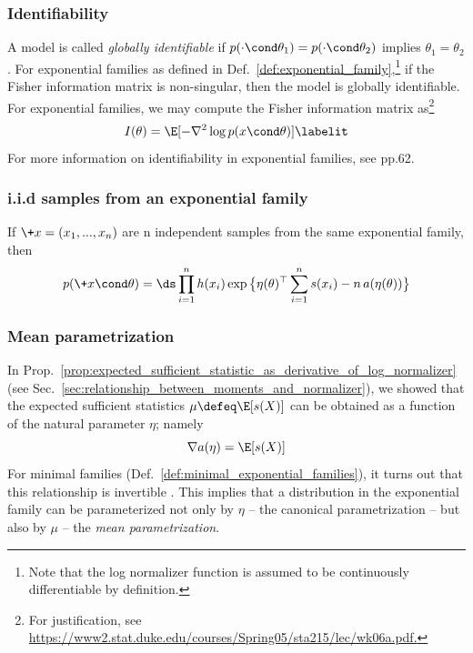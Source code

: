\documentclass{article} %
\newcommand{\logNormalizerFunction}{a}
\newcommand{\sufficientStatsFunction}{s}
\newcommand{\carrierDensity}{h}
\newcommand{\meanParameter}{\mu}
\newcommand{\param}{\theta}
\newcommand{\naturalParam}{\eta}
\begin{document}
\subsubsection{Identifiability}

A model is called \textit{globally identifiable} if $p(\cdot \cond \param_1) = p(\cdot \cond \param_2)$ implies $\param_1=\param_2$ \cite{cole2020parameter}. For exponential families as defined in Def.~\ref{def:exponential_family},\footnote{Note that the log normalizer function is assumed to be continuously differentiable by definition.} if the Fisher information matrix is non-singular, then the model is globally identifiable.  For exponential families, we may compute the Fisher information matrix as\footnote{For justification, see \url{https://www2.stat.duke.edu/courses/Spring05/sta215/lec/wk06a.pdf.}}
\begin{align*}
I(\param) = \E [ -\nabla^2 \log p(x \cond \param)]
\labelit \label{eqn:fisher_information_matrix_for_exponential_families}	
\end{align*}
For more information on identifiability in exponential families, see \cite{cole2020parameter} pp.62. 

\subsubsection{i.i.d samples from an exponential family} \label{sec:iid_samples_from_an_exponential_family}
If $\+x=(x_1, ..., x_n)$ are n independent samples from the same exponential family, then 
\begin{align}
\label{eqn:exponential_family_iid}
 p(\+x \cond \param) = \ds\prod_{i=1}^n \carrierDensity(x_i) \exp \big\{ \naturalParam(\param)^\top \sum_{i=1}^n \sufficientStatsFunction(x_i) - n \,\logNormalizerFunction(\naturalParam(\param))\big\} 
 \end{align}


\subsubsection{Mean parametrization} \label{sec:mean_parametrization}

In Prop.~\ref{prop:expected_sufficient_statistic_as_derivative_of_log_normalizer} (see Sec.~\ref{sec:relationship_between_moments_and_normalizer}), we showed that the expected sufficient statistics $\meanParameter \defeq \E[\sufficientStatsFunction(X)]$ can be obtained as a function of the natural parameter $\naturalParam$; namely
%
\[ \nabla \logNormalizerFunction(\naturalParam) = \E[\sufficientStatsFunction(X)] \]
%
For minimal families (Def.~\ref{def:minimal_exponential_families}), it turns out that this relationship is invertible \cite[Sec.~8.4]{jordan2010exponential}.   This implies that a distribution in the exponential family can be parameterized not only by $\naturalParam$ -- the canonical parametrization -- but also by $\meanParameter$ -- the \textit{mean parametrization}.   
\end{document}
